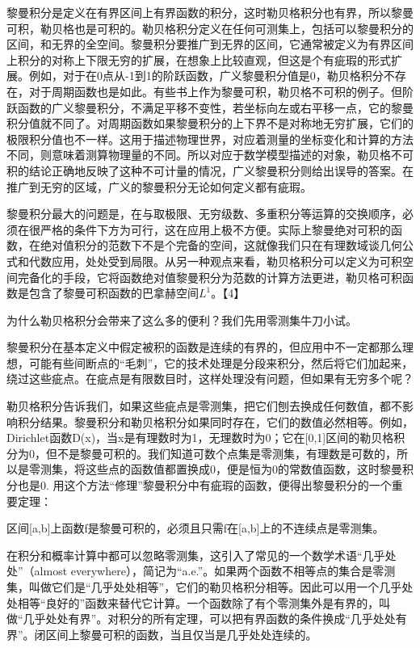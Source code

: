 黎曼积分是定义在有界区间上有界函数的积分，这时勒贝格积分也有界，所以黎曼可积，勒贝格也是可积的。勒贝格积分定义在任何可测集上，包括可以黎曼积分的区间，和无界的全空间。黎曼积分要推广到无界的区间，它通常被定义为有界区间上积分的对称上下限无穷的扩展，在想象上比较直观，但这是个有疵瑕的形式扩展。例如，对于在0点从-1到1的阶跃函数，广义黎曼积分值是0，勒贝格积分不存在，对于周期函数也是如此。有些书上作为黎曼可积，勒贝格不可积的例子。但阶跃函数的广义黎曼积分，不满足平移不变性，若坐标向左或右平移一点，它的黎曼积分值就不同了。对周期函数如果黎曼积分的上下界不是对称地无穷扩展，它们的极限积分值也不一样。这用于描述物理世界，对应着测量的坐标变化和计算的方法不同，则意味着测算物理量的不同。所以对应于数学模型描述的对象，勒贝格不可积的结论正确地反映了这种不可计量的情况，广义黎曼积分则给出误导的答案。在推广到无穷的区域，广义的黎曼积分无论如何定义都有疵瑕。

黎曼积分最大的问题是，在与取极限、无穷级数、多重积分等运算的交换顺序，必须在很严格的条件下方为可行，这在应用上极不方便。实际上黎曼绝对可积的函数，在绝对值积分的范数下不是个完备的空间，这就像我们只在有理数域谈几何公式和代数应用，处处受到局限。从另一种观点来看，勒贝格积分可以定义为可积空间完备化的手段，它将函数绝对值黎曼积分为范数的计算方法更进，勒贝格可积函数是包含了黎曼可积函数的巴拿赫空间$ L^{1} $。【4】

为什么勒贝格积分会带来了这么多的便利？我们先用零测集牛刀小试。

黎曼积分在基本定义中假定被积的函数是连续的有界的，但应用中不一定都那么理想，可能有些间断点的“毛刺”，它的技术处理是分段来积分，然后将它们加起来，绕过这些疵点。在疵点是有限数目时，这样处理没有问题，但如果有无穷多个呢？

勒贝格积分告诉我们，如果这些疵点是零测集，把它们刨去换成任何数值，都不影响积分结果。黎曼积分和勒贝格积分如果同时存在，它们的数值必然相等。例如，Dirichlet函数D(x)，当x是有理数时为1，无理数时为0；它在[0,1]区间的勒贝格积分为0，但不是黎曼可积的。我们知道可数个点集是零测集，有理数是可数的，所以是零测集，将这些点的函数值都置换成0，便是恒为0的常数值函数，这时黎曼积分也是0. 用这个方法“修理”黎曼积分中有疵瑕的函数，便得出黎曼积分的一个重要定理：

\kaishu\setlength{\leftskip}{1em}

区间[a,b]上函数f是黎曼可积的，必须且只需f在[a,b]上的不连续点是零测集。

\songti\setlength{\leftskip}{0em}


在积分和概率计算中都可以忽略零测集，这引入了常见的一个数学术语“几乎处处”（almost everywhere），简记为“a.e.”。如果两个函数不相等点的集合是零测集，叫做它们是“几乎处处相等”，它们的勒贝格积分相等。因此可以用一个几乎处处相等“良好的”函数来替代它计算。一个函数除了有个零测集外是有界的，叫做“几乎处处有界”。对积分的所有定理，可以把有界函数的条件换成“几乎处处有界”。闭区间上黎曼可积的函数，当且仅当是几乎处处连续的。

